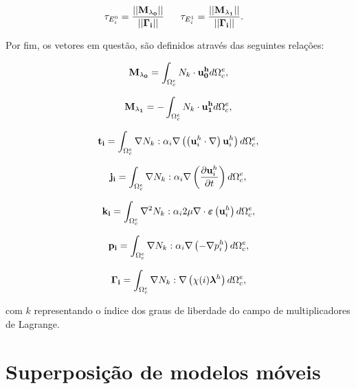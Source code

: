 \documentclass[tese_patricia]{subfiles}
\begin{document}
\begin{align}
	\tau_{E_i^{0}} = \frac{|| \mathbf{M_{\lambda_0}} || }{||\mathbf{\Gamma_{i}} ||} \ \ \ \ \  & \tau_{E_i^{1}} = \frac{|| \mathbf{M_{\lambda_1}} || }{||\mathbf{\Gamma_{i}} ||}.
\end{align}

Por fim, os vetores em questão, são definidos através das seguintes relações:


\begin{align}
	\mathbf{M_{\lambda_0}} = \int_{\Omega_{c}^{e}} N_{k} \cdot \mathbf{u_{0}^{h}} d\Omega_{c}^{e},
\end{align}

\begin{align}
	\mathbf{M_{\lambda_1}} = - \int_{\Omega_{c}^{e}} N_{k} \cdot \mathbf{u_{1}^{h}} d\Omega_{c}^{e},
\end{align}

\begin{align}
	\mathbf{t_{i}} = \int_{\Omega_{c}^{e}} \nabla N_{k} : \alpha_{i} \nabla \left( \left( \mathbf{u}_i^{h} \cdot  \nabla \right) \mathbf{u}_i^{h} \right)  d\Omega_{c}^{e},
\end{align}

\begin{align}
	\mathbf{j_{i}} = \int_{\Omega_{c}^{e}} \nabla N_{k} :  \alpha_{i} \nabla \left(\frac{\partial\mathbf{u}_i^{h}}{\partial t}  \right)  d\Omega_{c}^{e},
\end{align}

\begin{align}
	\mathbf{k_{i}} = \int_{\Omega_{c}^{e}} \nabla^{2} N_{k} : \alpha_{i} 2 \mu \nabla \cdot \bm{\varepsilon} \left(\mathbf{u}_i^{h}\right)    d\Omega_{c}^{e},
\end{align}

\begin{align}
	\mathbf{p_{i}} = \int_{\Omega_{c}^{e}} \nabla N_{k} : \alpha_{i} \nabla \left(-\nabla p_i^h\right)    d\Omega_{c}^{e},
\end{align}

\begin{align}
	\mathbf{\Gamma_{i}} = \int_{\Omega_{c}^{e}} \nabla N_{k} : \nabla \left(\chi (i) \boldsymbol{\lambda}^h\right)    d\Omega_{c}^{e},
\end{align}


\noindent com $k$ representando o índice dos graus de liberdade do campo de multiplicadores de Lagrange.


\section{Superposição de modelos móveis}
\end{document}
